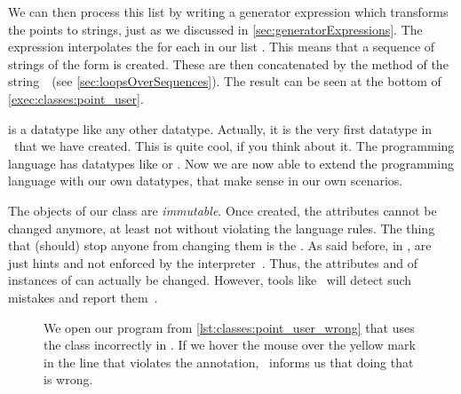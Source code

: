 We can then process this list by writing a generator expression which transforms the points to strings, just as we discussed in \cref{sec:generatorExpressions}.
The expression interpolates the   for each   in our list .
This means that a sequence of strings of the form  is created.
These are then concatenated by the  method of the string~\pythonil{\", \"}~(see \cref{sec:loopsOverSequences}).
The result can be seen at the bottom of \cref{exec:classes:point_user}.

 is a datatype like any other datatype.
Actually, it is the very first datatype in \python\ that we have created.
This is quite cool, if you think about it.
The programming language has datatypes like  or .
Now we are now able to extend the programming language with our own datatypes, that make sense in our own scenarios.

The objects of our  class are \emph{immutable}.
Once created, the attributes cannot be changed anymore, at least not without violating the language rules.
The thing that (should) stop anyone from changing them is the  .
As said before, in \python,  are just hints and not enforced by the interpreter~\cite{PEP591}.
Thus, the attributes  and  of instances of  can actually be changed.
However, tools like \mypy\ will detect such mistakes and report them~\cite{PEP591}.%

%
%
%
\begin{figure}%
\centering%
%
\caption{%
We open our program  from \cref{lst:classes:point_user_wrong} that uses the class  incorrectly in \pycharm. %
If we hover the mouse over the yellow mark in the line that violates the  annotation, \pycharm\ informs us that doing that is wrong.}%
\label{fig:finalViolatedPycharm}%
\end{figure}%
%
%
%

